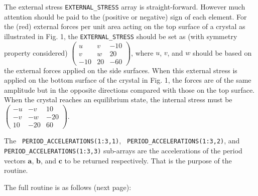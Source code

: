 \documentclass[aps]{revtex4}
\newcommand{\ba}{\mathbf a}
\newcommand{\bb}{\mathbf b}
\newcommand{\bc}{\mathbf c}
\begin{document}
  \vspace{2cm}
The external stress \verb!EXTERNAL_STRESS! array is straight-forward. However much attention should be paid to the (positive or negative) sign of each element. For the (red) external forces per unit area acting on the top surface of a crystal as illustrated in Fig. 1, the \verb!EXTERNAL_STRESS! should be set as (with symmetry property considered)
  $ \left( \begin{array}{rrr}
           u &   v &    -10 \\ 
           v &  w &  20 \\ 
           -10 &  20 &   -60
            \end{array}
     \right)  
  $,
where $u$, $v$, and $w$ should be based on the external forces applied on the side surfaces. When this external stress is applied on the bottom surface of the crystal in Fig. 1, the forces are of the same amplitude but in the opposite directions compared with those on the top surface. When the crystal reaches an equilibrium state, the internal stress must be
  $ \left( \begin{array}{rrr}
           -u &  - v &    10 \\ 
           -v &  -w &  -20 \\ 
           10 &  -20 &  60
            \end{array}
     \right)  
  $.




The  \verb! PERIOD_ACCELERATIONS(1:3,1)!,  \verb! PERIOD_ACCELERATIONS(1:3,2)!, 
and  \verb! PERIOD_ACCELERATIONS(1:3,3)! sub-arrays 
are the accelerations of the period vectors $\ba$, $\bb$, and $\bc$ to be returned respectively. That is the purpose of the routine.



  \vspace{0cm}
The full routine is as follows (next page):

\newpage
\end{document}
